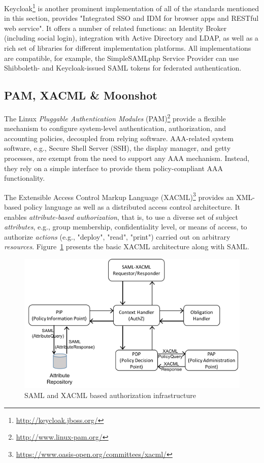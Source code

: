 \documentclass{llncs}
\begin{document}
Keycloak\footnote{\url{http://keycloak.jboss.org/}} is another prominent implementation of all of the standards mentioned in this section, provides "Integrated SSO and IDM for browser apps and RESTful web service". It offers a number of related functions: an Identity Broker (including social login), integration with Active Directory and LDAP, as well as a rich set of libraries for different implementation platforms. All implementations are compatible, for example, the SimpleSAMLphp Service Provider can use Shibboleth- and Keycloak-issued SAML tokens for federated authentication.

\subsection{PAM, XACML \& Moonshot}

The Linux \textit{Pluggable Authentication Modules} (PAM)\footnote{\url{http://www.linux-pam.org/}} provide a flexible mechanism to configure system-level authentication, authorization, and accounting policies, decoupled from relying software. AAA-related system software, e.g., Secure Shell Server (SSH), the display manager, and getty processes, are exempt from the need to support any AAA mechanism. Instead, they rely on a simple interface to provide them policy-compliant AAA functionality. 

The Extensible Access Control Markup Language (XACML)\footnote{\url{https://www.oasis-open.org/committees/xacml/}} provides an XML-based policy language as well as a distributed access control architecture. It enables \textit{attribute-based authorization}, that is, to use a diverse set of subject \textit{attributes}, e.g., group membership, confidentiality level, or means of access, to authorize \textit{actions} (e.g., "deploy", "read", "print") carried out on arbitrary \textit{resources}. Figure~\ref{fig:architecturexacml} presents the basic XACML architecture along with SAML. 

\begin{figure}
	\vspace*{-0.5cm}
	\centering
	\includegraphics[scale=0.7]{XACMLBasedAuthzArchitecture}
	\caption{SAML and XACML based authorization infrastructure}
	\label{fig:architecturexacml}
\end{figure}
\end{document}
